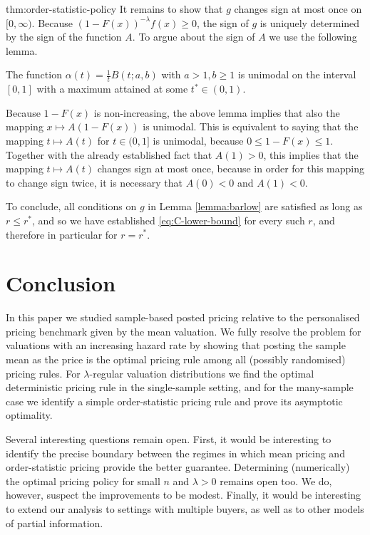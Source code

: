 \documentclass[11pt]{article}
\begin{document}
\begin{cleverproof}{thm:order-statistic-policy}
It remains to show that $g$ changes sign at most once on $[0,\infty)$. Because $(1-F(x))^{-\lambda}f(x)\ge 0$, the sign of $g$ is uniquely determined by the sign of the function $A$.  To argue about the sign of $A$ we use the following lemma.

\begin{lemma}
    \label{lemma:unimodal-beta-average}
    The function $\alpha(t)=\frac{1}{t}B(t;a,b)$ with $a>1,b\ge 1$ is unimodal on the interval $[0,1]$ with a maximum attained at some $t^* \in (0,1)$. 
\end{lemma}

Because $1 - F(x)$ is non-increasing, the above lemma implies that also the mapping $x\mapsto A(1-F(x))$ is unimodal. This is equivalent to saying that the mapping $t \mapsto A(t)$ for $t \in (0,1]$ is unimodal, because $0 \leq 1 - F(x) \leq 1$. Together with the already established fact that $A(1) > 0$, this implies that the mapping $t \mapsto A(t)$ changes sign at most once, because in order for this mapping to change sign twice, it is necessary that $A(0) < 0$ and $A(1) < 0$.

To conclude, all conditions on $g$ in Lemma \ref{lemma:barlow} are satisfied as long as $r \leq r^*$, and so we have established \eqref{eq:C-lower-bound} for every such $r$, and therefore in particular for $r = r^*$.
\end{cleverproof}
    

    
\section{Conclusion}

In this paper we studied sample-based posted pricing relative to the personalised pricing benchmark given by the mean valuation. 
We fully resolve the problem for valuations with an increasing hazard rate by showing that posting the sample mean as the price is the optimal pricing rule among all (possibly randomised) pricing rules. 
For $\lambda$-regular valuation distributions we find the optimal deterministic pricing rule in the single-sample setting, and for the many-sample case we identify a simple order-statistic pricing rule and prove its asymptotic optimality.

Several interesting questions remain open. First, it would be interesting to identify the precise boundary between the regimes in which mean pricing and order-statistic pricing provide the better guarantee.
Determining (numerically) the optimal pricing policy for small $n$ and $\lambda>0$ remains open too. We do, however, suspect the improvements to be modest.
Finally, it would be interesting to extend our analysis to settings with multiple buyers, as well as to other models of partial information.
\end{document}
